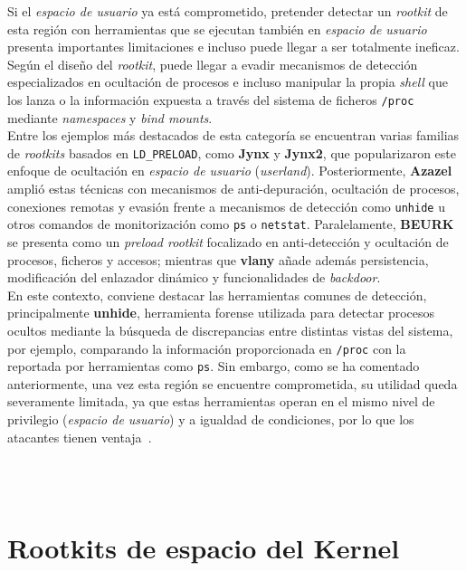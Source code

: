 Si el \textit{espacio de usuario} ya está comprometido, pretender detectar un \textit{rootkit} de esta región con herramientas que se ejecutan también en \textit{espacio de usuario} presenta importantes limitaciones e incluso puede llegar a ser totalmente ineficaz.
Según el diseño del \textit{rootkit}, puede llegar a evadir mecanismos de detección especializados en ocultación de procesos e incluso manipular la propia \textit{shell} que los lanza o la información expuesta a través del sistema de ficheros \texttt{/proc} mediante \textit{namespaces} y \textit{bind mounts}.\\

Entre los ejemplos más destacados de esta categoría se encuentran varias familias de \textit{rootkits} basados en \texttt{LD\_PRELOAD},
como \textbf{Jynx} y \textbf{Jynx2}, que popularizaron este enfoque de ocultación en \textit{espacio de usuario} (\textit{userland}).
Posteriormente, \textbf{Azazel} amplió estas técnicas con mecanismos de anti-depuración, ocultación de procesos, conexiones remotas y evasión frente a mecanismos de detección como \texttt{unhide} u otros comandos de monitorización como \texttt{ps} o \texttt{netstat}.
Paralelamente, \textbf{BEURK} se presenta como un \textit{preload rootkit} focalizado en anti-detección y ocultación de procesos, ficheros y accesos;
mientras que \textbf{vlany} añade además persistencia, modificación del enlazador dinámico y funcionalidades de \textit{backdoor}.\\

En este contexto, conviene destacar las herramientas comunes de detección,
principalmente \textbf{unhide}, herramienta forense utilizada para detectar procesos ocultos mediante la búsqueda de discrepancias entre distintas vistas del sistema,
por ejemplo, comparando la información proporcionada en \texttt{/proc} con la reportada por herramientas como \texttt{ps}.
Sin embargo, como se ha comentado anteriormente, una vez esta región se encuentre comprometida, su utilidad queda severamente limitada, ya que estas herramientas operan en el mismo nivel de privilegio (\textit{espacio de usuario}) y a igualdad de condiciones, por lo que los atacantes tienen ventaja~\cite{unhide_man}.\\

\

\

\section{Rootkits de espacio del Kernel}
\label{sec:kernel_rootkits}

